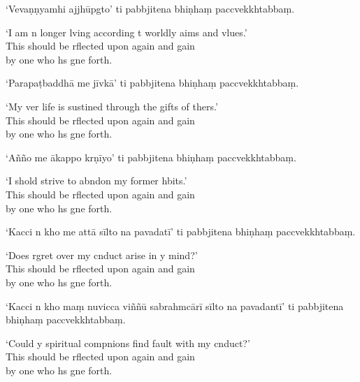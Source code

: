 `Vevaṇṇyamhi ajjhūpgto' ti pabbjitena bhiṇhaṃ paccvekkhtabbaṃ.

\begin{english}
  `I am n longer lving according t worldly aims and vlues.'\\
  This should be rflected upon again and gain\\
  by one who hs gne forth.
\end{english}

`Parapaṭbaddhā me jīvkā' ti pabbjitena bhiṇhaṃ paccvekkhtabbaṃ.

\begin{english}
  `My ver life is sustined through the gifts of thers.'\\
  This should be rflected upon again and gain\\
  by one who hs gne forth.
\end{english}

`Añño me ākappo krṇīyo' ti pabbjitena bhiṇhaṃ paccvekkhtabbaṃ.

\begin{english}
  `I shold strive to abndon my former hbits.'\\
  This should be rflected upon again and gain\\
  by one who hs gne forth.
\end{english}

\clearpage

`Kacci n kho me attā sīlto na pavadatī' ti pabbjitena bhiṇhaṃ paccvekkhtabbaṃ.

\begin{english}
  `Does rgret over my cnduct arise in y mind?'\\
  This should be rflected upon again and gain\\
  by one who hs gne forth.
\end{english}

`Kacci n kho maṃ nuvicca viññū sabrahmcārī sīlto na pavadantī' ti pabbjitena bhiṇhaṃ paccvekkhtabbaṃ.

\begin{english}
  `Could y spiritual compnions find fault with my cnduct?'\\
  This should be rflected upon again and gain\\
  by one who hs gne forth.
\end{english}

